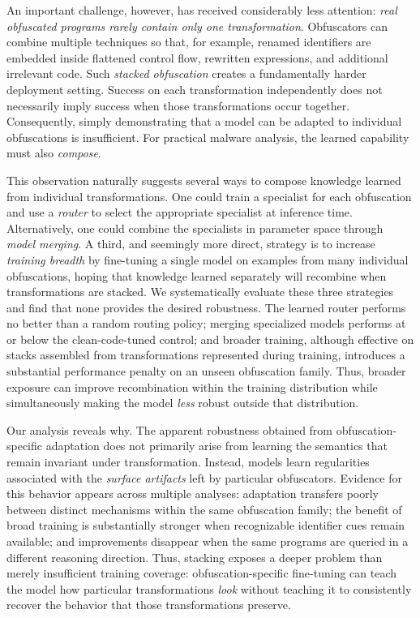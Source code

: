 
An important challenge, however, has received considerably less
attention: \emph{real obfuscated programs rarely contain only one
transformation}. Obfuscators can combine multiple techniques so that,
for example, renamed identifiers are embedded inside flattened control
flow, rewritten expressions, and additional irrelevant code. Such
\emph{stacked obfuscation} creates a fundamentally harder deployment
setting. Success on each transformation independently does not
necessarily imply success when those transformations occur together.
Consequently, simply demonstrating that a model can be adapted to
individual obfuscations is insufficient. For practical malware
analysis, the learned capability must also \emph{compose}.

This observation naturally suggests several ways to compose knowledge
learned from individual transformations. One could train a specialist
for each obfuscation and use a \emph{router} to select the appropriate
specialist at inference time. Alternatively, one could combine the
specialists in parameter space through \emph{model merging}. A third,
and seemingly more direct, strategy is to increase \emph{training
breadth} by fine-tuning a single model on examples from many individual
obfuscations, hoping that knowledge learned separately will recombine
when transformations are stacked. We systematically evaluate these
three strategies and find that none provides the desired robustness.
The learned router performs no better than a random routing policy;
merging specialized models performs at or below the clean-code-tuned
control; and broader training, although effective on stacks assembled
from transformations represented during training, introduces a
substantial performance penalty on an unseen obfuscation
family. Thus, broader exposure can improve recombination within the
training distribution while simultaneously making the model
\emph{less} robust outside that distribution.

Our analysis reveals why. The apparent robustness obtained from
obfuscation-specific adaptation does not primarily arise from learning
the semantics that remain invariant under transformation. Instead,
models learn regularities associated with the \emph{surface artifacts}
left by particular obfuscators. Evidence for this behavior appears
across multiple analyses: adaptation transfers poorly between distinct
mechanisms within the same obfuscation family; the benefit of broad
training is substantially stronger when recognizable identifier cues
remain available; and improvements disappear when the same programs
are queried in a different reasoning direction. Thus, stacking exposes
a deeper problem than merely insufficient training coverage:
obfuscation-specific fine-tuning can teach the model how particular
transformations \emph{look} without teaching it to consistently recover
the behavior that those transformations preserve.

